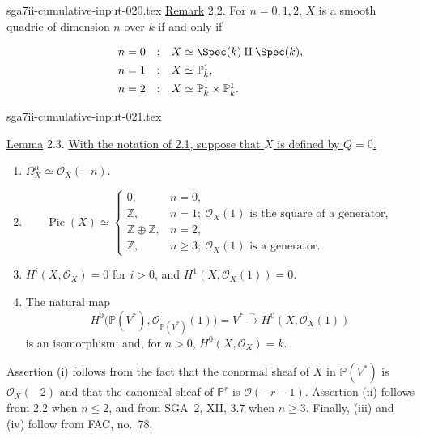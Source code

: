 \begin{filecontents*}{sga7ii-cumulative-input-020.tex}
\underline{Remark} 2.2. For $n=0,1,2$, $X$ is a smooth quadric of
dimension $n$ over $k$ if and only if

\begin{equation*}
\begin{array}{rcl}
n=0 &:& X\simeq\Spec(k)\amalg\Spec(k),\\[1ex]
n=1 &:& X\simeq\mathbb P^1_k,\\[1ex]
n=2 &:& X\simeq\mathbb P^1_k\times\mathbb P^1_k.
\end{array}
\end{equation*}
\end{filecontents*}
\begin{filecontents*}{sga7ii-cumulative-input-021.tex}

\underline{Lemma} 2.3. \underline{With the notation of 2.1, suppose that
$X$ is defined by $Q=0$.}

\begin{enumerate}[label=(\roman*),leftmargin=2.6em]
\item $\Omega_X^n\simeq\mathcal O_X(-n)$.

\item
\begin{equation*}
\operatorname{Pic}(X)\simeq
\begin{cases}
0, & n=0,\\
\mathbb Z, & n=1;\ \mathcal O_X(1)\text{ is the square of a generator},\\
\mathbb Z\oplus\mathbb Z, & n=2,\\
\mathbb Z, & n\geq 3;\ \mathcal O_X(1)\text{ is a generator}.
\end{cases}
\end{equation*}

\item $H^i(X,\mathcal O_X)=0$ for $i>0$, and
$H^1(X,\mathcal O_X(1))=0$.

\item The natural map
\begin{equation*}
H^0\bigl(\mathbb P(V^*),\mathcal O_{\mathbb P(V^*)}(1)\bigr)
=V^*\xrightarrow{\sim}H^0(X,\mathcal O_X(1))
\end{equation*}
is an isomorphism; and, for $n>0$,
$H^0(X,\mathcal O_X)=k$.
\end{enumerate}

Assertion (i) follows from the fact that the conormal sheaf of $X$ in
$\mathbb P(V^*)$ is $\mathcal O_X(-2)$ and that the canonical sheaf of
$\mathbb P^r$ is $\mathcal O(-r-1)$.  Assertion (ii) follows from 2.2
when $n\leq 2$, and from SGA~2, XII, 3.7 when $n\geq 3$.  Finally, (iii)
and (iv) follow from FAC, no.~78.


\end{filecontents*}
